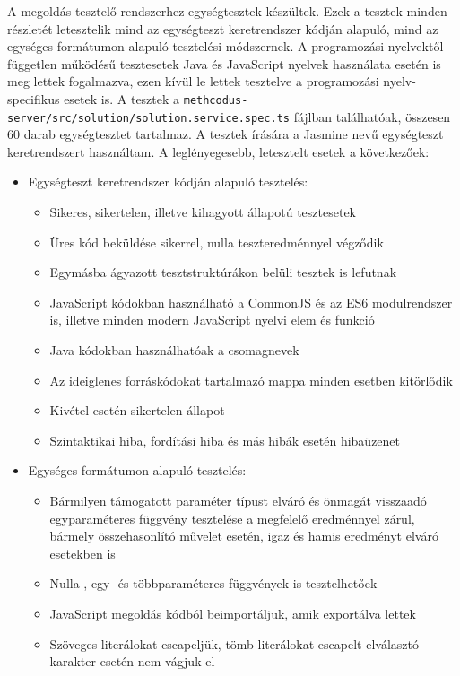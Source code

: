 \documentclass{elteikthesis}
\begin{document}
				A megoldás tesztelő rendszerhez egységtesztek készültek. Ezek a tesztek minden részletét letesztelik mind az egységteszt keretrendszer kódján alapuló, mind az egységes formátumon alapuló tesztelési módszernek. A programozási nyelvektől független működésű tesztesetek Java és JavaScript nyelvek használata esetén is meg lettek fogalmazva, ezen kívül le lettek tesztelve a programozási nyelv-specifikus esetek is. A tesztek a \texttt{methcodus-server/src/solution/solution.service.spec.ts} fájlban találhatóak, összesen 60 darab egységtesztet tartalmaz. A tesztek írására a Jasmine nevű egységteszt keretrendszert használtam. A leglényegesebb, letesztelt esetek a következőek:
				\begin{itemize}
					\item Egységteszt keretrendszer kódján alapuló tesztelés:
					\begin{itemize}
						\setlength\itemsep{-0.5em}
						\item Sikeres, sikertelen, illetve kihagyott állapotú tesztesetek
						\item Üres kód beküldése sikerrel, nulla teszteredménnyel végződik
						\item Egymásba ágyazott tesztstruktúrákon belüli tesztek is lefutnak
						\item JavaScript kódokban használható a CommonJS és az ES6 modulrendszer is, illetve minden modern JavaScript nyelvi elem és funkció
						\item Java kódokban használhatóak a csomagnevek
						\item Az ideiglenes forráskódokat tartalmazó mappa minden esetben kitörlődik
						\item Kivétel esetén sikertelen állapot
						\item Szintaktikai hiba, fordítási hiba és más hibák esetén hibaüzenet
					\end{itemize}
					\item Egységes formátumon alapuló tesztelés:
					\begin{itemize}
						\setlength\itemsep{-0.5em}
						\item Bármilyen támogatott paraméter típust elváró és önmagát visszaadó egyparaméteres függvény tesztelése a megfelelő eredménnyel zárul, bármely összehasonlító művelet esetén, igaz és hamis eredményt elváró esetekben is
						\item Nulla-, egy- és többparaméteres függvények is tesztelhetőek
						\item JavaScript megoldás kódból beimportáljuk, amik exportálva lettek
						\item Szöveges literálokat escapeljük, tömb literálokat escapelt elválasztó karakter esetén nem vágjuk el
					\end{itemize}
				\end{itemize}
			
\end{document}
